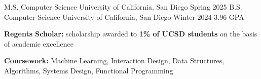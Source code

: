 

\begin{cventries}
\begin{comment}\cventrytwoalt
{M.S. Computer Science} %
{B.S. Cognitive Science (Specialization: Design and Interaction)} %
{University of California, San Diego} %
{3.96 GPA} %
{Fall 2020 - Winter 2024} %
{
  \begin{cvitems} %
    \item {\textbf{Regents Scholar:} scholarship awarded to \textbf{1\% of UCSD students} on the basis of academic excellence}
    \item {\textbf{Coursework:} Machine Learning, Interaction Design, Data Structures, Algorithms, Systems Design, Functional Programming}
  \end{cvitems}
}
\end{comment}

\cventry
  {M.S. Computer Science}
  {University of California, San Diego} %
  {Spring 2025} %
  {} %
  {}
\vspace{-7pt}
\cventry
  {B.S. Computer Science}
  {University of California, San Diego} %
  {Winter 2024} %
  {3.96 GPA} %
  {
  \begin{cvitems} %
    \item {\textbf{Regents Scholar:} scholarship awarded to \textbf{1\% of UCSD students} on the basis of academic excellence}
    \item {\textbf{Coursework:} Machine Learning, Interaction Design, Data Structures, Algorithms, Systems Design, Functional Programming}
  \end{cvitems}
  }

\end{cventries}
